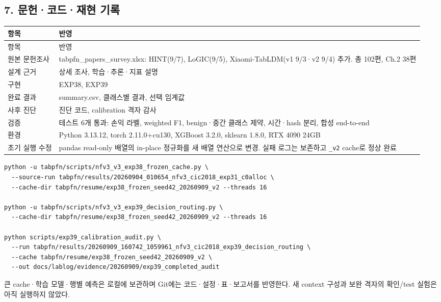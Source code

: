 \subsection{7. 문헌·코드·재현 기록}
\begingroup
\footnotesize
\begin{longtable}{>{\raggedright\arraybackslash}p{}>{\raggedright\arraybackslash}p{}}
\toprule
항목 & 반영 \\ \midrule
\endfirsthead
항목 & 반영 \\ \midrule
\endhead
{}원본 문헌조사 & tabpfn\_\allowbreak{}papers\_\allowbreak{}survey.xlsx: HINT(9/\allowbreak{}7), LoGIC(9/\allowbreak{}5), Xiaomi-TabLDM(v1 9/\allowbreak{}3·v2 9/\allowbreak{}4) 추가. 총 102편, Ch.2 38편 \\
{}설계 근거 & 상세 조사, 학습·추론·지표 설명 \\
{}구현 & EXP38, EXP39 \\
{}완료 결과 & summary.csv, 클래스별 결과, 선택 임계값 \\
{}사후 진단 & 진단 코드, calibration 격자 감사 \\
{}검증 & 테스트 6개 통과: 손익 라벨, weighted F1, benign·중간 클래스 제약, 시간·hash 분리, 합성 end-to-end \\
{}환경 & Python 3.13.12, torch 2.11.0+\allowbreak{}cu130, XGBoost 3.2.0, sklearn 1.8.0, RTX 4090 24GB \\
{}초기 실행 수정 & pandas read-only 배열의 in-place 정규화를 새 배열 연산으로 변경. 실패 로그는 보존하고 \texttt{\_\allowbreak{}\allowbreak{}v2} cache로 정상 완료 \\
\bottomrule
\end{longtable}
\endgroup

\begin{Verbatim}[breaklines=true,breakanywhere=true,fontsize=\scriptsize]
python -u tabpfn/scripts/nfv3_v3_exp38_frozen_cache.py \
  --source-run tabpfn/results/20260904_010654_nfv3_cic2018_exp31_c0alloc \
  --cache-dir tabpfn/resume/exp38_frozen_seed42_20260909_v2 --threads 16

python -u tabpfn/scripts/nfv3_v3_exp39_decision_routing.py \
  --cache-dir tabpfn/resume/exp38_frozen_seed42_20260909_v2 --threads 16

python scripts/exp39_calibration_audit.py \
  --run tabpfn/results/20260909_160742_1059961_nfv3_cic2018_exp39_decision_routing \
  --cache tabpfn/resume/exp38_frozen_seed42_20260909_v2 \
  --out docs/lablog/evidence/20260909/exp39_completed_audit

\end{Verbatim}
큰 cache·학습 모델·행별 예측은 로컬에 보관하며 Git에는 코드·설정·표·보고서를 반영한다. 새 context 구성과 보완 격자의 확인/\allowbreak{}test 실험은 아직 실행하지 않았다.


